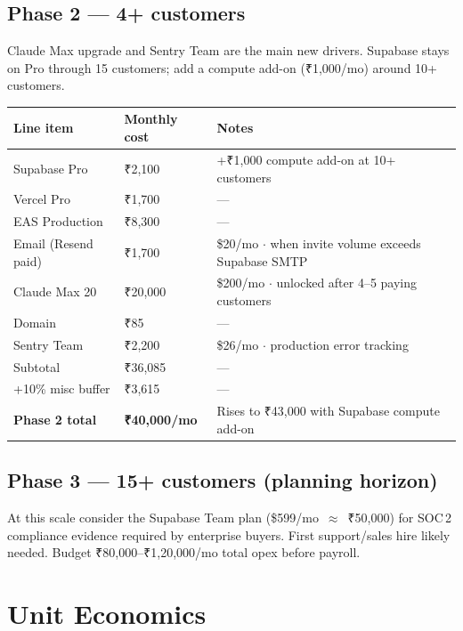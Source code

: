 \documentclass[12pt,a4paper]{article}
\newcommand{\tild}{\raisebox{0.17ex}{$\scriptstyle\sim$}}
\begin{document}
\subsection{Phase 2 --- 4+ customers}

Claude Max upgrade and Sentry Team are the main new drivers.
Supabase stays on Pro through \tild{}15 customers; add a compute add-on
(\tild{}₹1,000/mo) around 10+ customers.

\begin{tabular}{@{}L{5cm}R{3cm}L{7cm}@{}}
  \toprule
  \textbf{Line item} & \textbf{Monthly cost} & \textbf{Notes} \\
  \midrule
  Supabase Pro          & ₹2,100   & +₹1,000 compute add-on at 10+ customers \\
  Vercel Pro            & ₹1,700   & --- \\
  EAS Production        & ₹8,300   & --- \\
  Email (Resend paid)   & ₹1,700   & \$20/mo $\cdot$ when invite volume exceeds Supabase SMTP \\
  Claude Max 20\texttimes{}& ₹20,000  & \$200/mo $\cdot$ unlocked after 4--5 paying customers \\
  Domain                & ₹85      & --- \\
  Sentry Team           & ₹2,200   & \$26/mo $\cdot$ production error tracking \\
  \midrule
  Subtotal              & ₹36,085  & --- \\
  +10\% misc buffer     & ₹3,615   & --- \\
  \midrule
  \textbf{Phase 2 total} & \textbf{\tild{}₹40,000/mo} & Rises to ₹43,000 with Supabase compute add-on \\
  \bottomrule
\end{tabular}

\subsection{Phase 3 --- 15+ customers (planning horizon)}

At this scale consider the Supabase Team plan (\$599/mo~$\approx$~₹50,000) for
SOC\,2 compliance evidence required by enterprise buyers. First support/sales
hire likely needed. Budget ₹80,000--₹1,20,000/mo total opex before payroll.

\section{Unit Economics}
\end{document}
